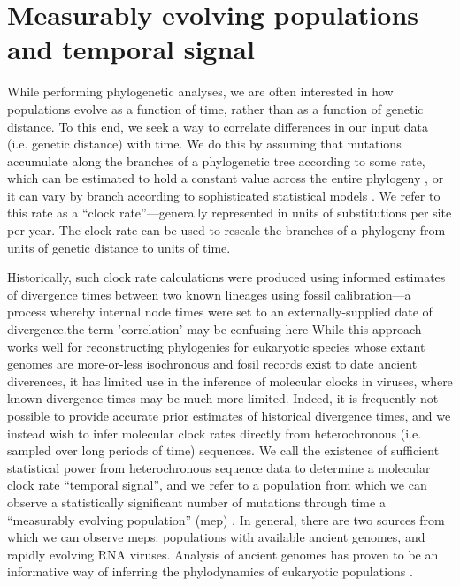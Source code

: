 \section{Measurably evolving populations and temporal signal}

While performing phylogenetic analyses, we are often interested in how populations evolve as a function of time, rather than as a function of genetic distance.
To this end, we seek a way to correlate differences in our input data (i.e. genetic distance) with time.
We do this by assuming that mutations accumulate along the branches of a phylogenetic tree according to some rate, which can be estimated to hold a constant value across the entire phylogeny \cite{brown2011rate}, or it can vary by branch according to sophisticated statistical models \cite{drummond2006relaxed, drummond2010randomLocal}.
We refer to this rate as a ``clock rate''---generally represented in units of substitutions per site per year.
The clock rate can be used to rescale the branches of a phylogeny from units of genetic distance to units of time.

Historically, such clock rate calculations were produced using informed estimates of divergence times between two known lineages using fossil calibration\cite{smith2010birds, near2005turtles}---a process whereby internal node times were set to an externally-supplied date of divergence.the term 'correlation' may be confusing here
While this approach works well for reconstructing phylogenies for eukaryotic species whose extant genomes are more-or-less isochronous and fosil records exist to date ancient diverences, it has limited use in the inference of molecular clocks in viruses, where known divergence times may be much more limited.
Indeed, it is frequently not possible to provide accurate prior estimates of historical divergence times, and we instead wish to infer molecular clock rates directly from heterochronous (i.e. sampled over long periods of time) sequences.
We call the existence of sufficient statistical power from heterochronous sequence data to determine a molecular clock rate ``temporal signal'', and we refer to a population from which we can observe a statistically significant number of mutations through time a ``measurably evolving population'' (\gls{mep}) \cite{drummond2003measurably}. %
In general, there are two sources from which we can observe \gls{mep}s: populations with available ancient genomes, and rapidly evolving RNA viruses.
Analysis of ancient genomes has proven to be an informative way of inferring the phylodynamics of eukaryotic populations \cite{shapiro2004bison}. %

